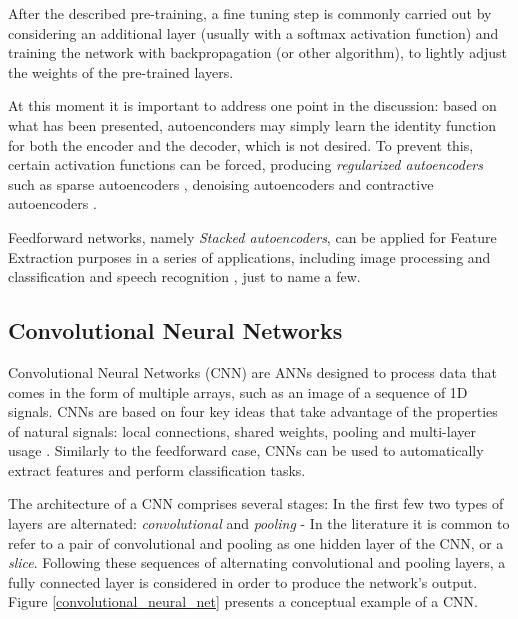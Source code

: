 \documentclass[9pt,journal,compsoc]{IEEEtran}
\begin{document}
After the described pre-training, a fine tuning step is commonly carried out by considering an additional layer (usually with a softmax activation function) and training the network with backpropagation (or other algorithm), to lightly adjust the weights of the pre-trained layers.

At this moment it is important to address one point in the discussion: based on what has been presented, autoenconders may simply learn the identity function for both the encoder and the decoder, which is not desired. To prevent this, certain activation functions can be forced, producing \emph{regularized autoencoders} such as sparse autoencoders \cite{vincent2010stacked}, denoising autoencoders \cite{ngiam2011optimization} and contractive autoencoders \cite{rifai2011contractive}.

Feedforward networks, namely \emph{Stacked autoencoders}, can be applied for Feature Extraction purposes in a series of applications, including image processing and classification and speech recognition \cite{vincent2010stacked, lu2013speech}, just to name a few.

\subsection{Convolutional Neural Networks}

Convolutional Neural Networks (CNN) are ANNs designed to process data that comes in the form of multiple arrays, such as an image of a sequence of 1D signals. CNNs are based on four key ideas that take advantage of the properties of natural signals: local connections, shared weights, pooling and multi-layer usage \cite{lecun2015deep}. Similarly to the feedforward case, CNNs can be used to automatically extract features and perform classification tasks.

The architecture of a CNN comprises several stages: In the first few two types of layers are alternated: \emph{convolutional} and \emph{pooling} - In the literature it is common to refer to a pair of convolutional and pooling as one hidden layer of the CNN, or a \emph{slice}. Following these sequences of alternating convolutional and pooling layers, a fully connected layer is considered in order to produce the network's output. Figure \ref{convolutional_neural_net} presents a conceptual example of a CNN.
\end{document}
